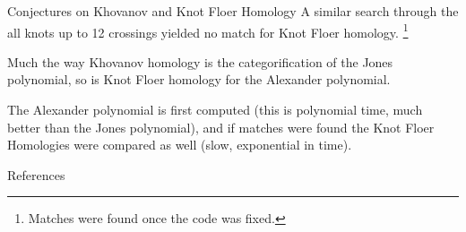 \documentclass{beamer}
\begin{document}
    \begin{frame}{Conjectures on Khovanov and Knot Floer Homology}
        A similar search through the all knots up to 12 crossings yielded no
        match for Knot Floer homology.%
        \footnote{\textbf{\color{red}{Correction:}} Matches were found once the
                  code was fixed.}
        \par\hfill\par
        Much the way Khovanov homology is the categorification of the Jones
        polynomial, so is Knot Floer homology for the Alexander polynomial.
        \par\hfill\par
        The Alexander polynomial is first computed (this is polynomial time,
        much better than the Jones polynomial), and if matches were found the
        Knot Floer Homologies were compared as well (slow, exponential in time).
    \end{frame}
    \begin{frame}[allowframebreaks]{References}
        
        
    \end{frame}
\end{document}
